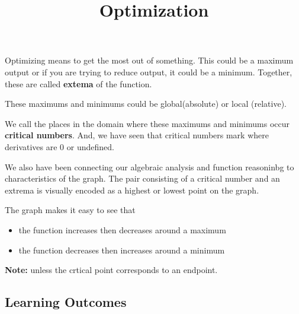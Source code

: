 \documentclass{ximera}
\title{Optimization}
\begin{document}
\begin{abstract}
\end{abstract}
\maketitle








Optimizing means to get the most out of something.  This could be a maximum output or if you are trying to reduce output, it could be a minimum. Together, these are called \textbf{extema} of the function.

These maximums and minimums could be global(absolute) or local (relative).


We call the places in the domain where these maximums and minimums occur \textbf{critical numbers}.  And, we have seen that critical numbers mark where derivatives are $0$ or undefined.


We also have been connecting our algebraic analysis and function reasoninbg to characteristics of the graph.  The pair consisting of a critical number and an extrema is visually encoded as a highest or lowest point on the graph.

The graph makes it easy to see that 

\begin{itemize}
\item the function increases then decreases around a maximum
\item the function decreases then increases around a minimum
\end{itemize}

\textbf{Note:} unless the crtical point corresponds to an endpoint.


















\subsection{Learning Outcomes}
\end{document}
